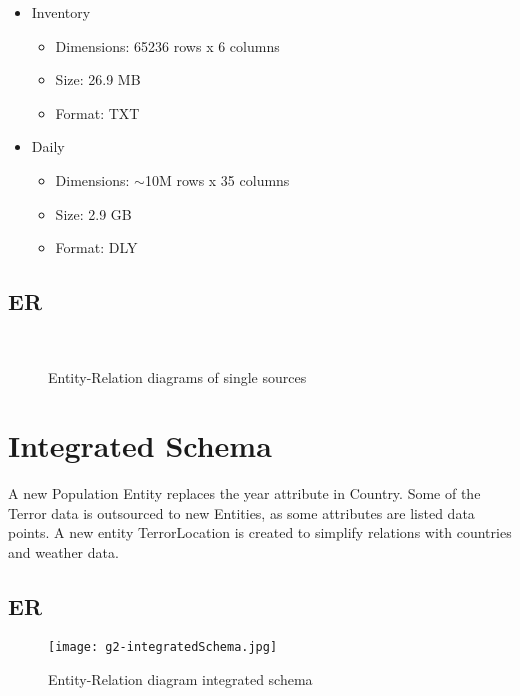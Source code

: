 \begin{itemize}
\begin{itemize}
		\item Inventory
		\begin{itemize}
		  \item Dimensions: 65236 rows x 6 columns
		  \item Size: 26.9 MB
		  \item Format: TXT
	    \end{itemize}
		\item Daily
		\begin{itemize}
		  \item Dimensions: $\sim$10M rows x 35 columns
		  \item Size: 2.9 GB
		  \item Format: DLY
	    \end{itemize}
	\end{itemize}
\end{itemize}

\subsection{ER}
\begin{figure}[hbt!]
    \qquad
    \qquad
    \centering
    \qquad\\
    \centering
    \qquad
    \caption{Entity-Relation diagrams of single sources}
\label{fig:example subfigure}
\end{figure}




\section{Integrated Schema}
A new Population Entity replaces the year attribute in Country. Some of the Terror data is outsourced to new Entities, as some attributes are listed data points. A new entity TerrorLocation is created to simplify relations with countries and weather data.

\subsection{ER}
\begin{figure}[hbt!]
	\centering
	\texttt{[image: g2-integratedSchema.jpg]}
	\caption{Entity-Relation diagram integrated schema}
\end{figure}
    
